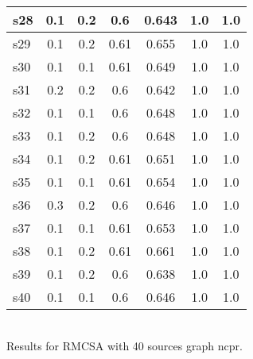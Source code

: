 \documentclass{article}
\begin{document}
\begin{tabular}{|l|c|c|c|c|c|c|}
\hline
s28 &0.1 & 0.2 & 0.6 & 0.643 & 1.0 & 1.0\\
\hline
s29 &0.1 & 0.2 & 0.61 & 0.655 & 1.0 & 1.0\\
\hline
s30 &0.1 & 0.1 & 0.61 & 0.649 & 1.0 & 1.0\\
\hline
s31 &0.2 & 0.2 & 0.6 & 0.642 & 1.0 & 1.0\\
\hline
s32 &0.1 & 0.1 & 0.6 & 0.648 & 1.0 & 1.0\\
\hline
s33 &0.1 & 0.2 & 0.6 & 0.648 & 1.0 & 1.0\\
\hline
s34 &0.1 & 0.2 & 0.61 & 0.651 & 1.0 & 1.0\\
\hline
s35 &0.1 & 0.1 & 0.61 & 0.654 & 1.0 & 1.0\\
\hline
s36 &0.3 & 0.2 & 0.6 & 0.646 & 1.0 & 1.0\\
\hline
s37 &0.1 & 0.1 & 0.61 & 0.653 & 1.0 & 1.0\\
\hline
s38 &0.1 & 0.2 & 0.61 & 0.661 & 1.0 & 1.0\\
\hline
s39 &0.1 & 0.2 & 0.6 & 0.638 & 1.0 & 1.0\\
\hline
s40 &0.1 & 0.1 & 0.6 & 0.646 & 1.0 & 1.0\\
\hline
\end{tabular}\\

\noindent Results for RMCSA with 40 sources graph ncpr.
\end{document}
